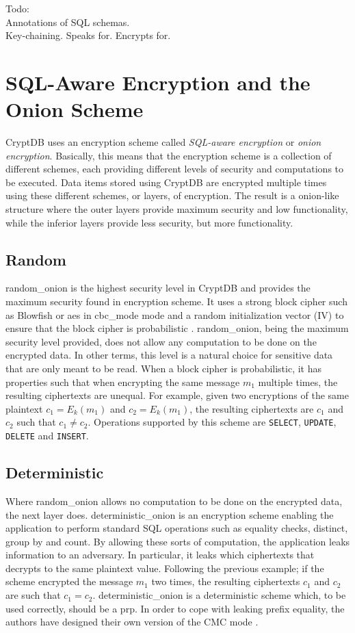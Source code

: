 Todo:\\
Annotations of SQL schemas.\\
Key-chaining. Speaks for. Encrypts for.\\


\section{SQL-Aware Encryption and the Onion Scheme}

CryptDB uses an encryption scheme called \emph{SQL-aware encryption} or \textit{onion encryption}. Basically, this means that the encryption scheme is a collection of different schemes, each providing different levels of security and computations to be executed. Data items stored using CryptDB are encrypted multiple times using these different schemes, or layers, of encryption. The result is a onion-like structure where the outer layers provide maximum security and low functionality, while the inferior layers provide less security, but more functionality.


\subsection{Random}
\Gls{random_onion} is the highest security level in CryptDB and provides the maximum security found in encryption scheme. It uses a strong block cipher such as Blowfish or \Gls{aes} in \Gls{cbc_mode} mode and a random initialization vector (IV) to ensure that the block cipher is probabilistic \citep{CryptDB_Main_Paper}. \Gls{random_onion}, being the maximum security level provided, does not allow any computation to be done on the encrypted data. In other terms, this level is a natural choice for sensitive data that are only meant to be read. When a block cipher is probabilistic, it has properties such that when encrypting the same message $m_1$ multiple times, the resulting ciphertexts are unequal. For example, given two encryptions of the same plaintext $c_1 = E_k(m_1)$ and $c_2 = E_k(m_1)$, the resulting ciphertexts are $c_1$ and $c_2$ such that $c_1 \neq c_2$. Operations supported by this scheme are \verb!SELECT!, \verb!UPDATE!, \verb!DELETE! and \verb!INSERT!.


\subsection{Deterministic}
Where \Gls{random_onion} allows no computation to be done on the encrypted data, the next layer does. \Gls{deterministic_onion} is an encryption scheme enabling the application to perform standard SQL operations such as equality checks, distinct, group by and count. By allowing these sorts of computation, the application leaks information to an adversary. In particular, it leaks which ciphertexts that decrypts to the same plaintext value. Following the previous example; if the scheme encrypted the message $m_1$ two times, the resulting ciphertexts $c_1$ and $c_2$ are such that $c_1 = c_2$. \Gls{deterministic_onion} is a deterministic scheme which, to be used correctly, should be a \Gls{prp}. In order to cope with leaking prefix equality, the authors have designed their own version of the CMC mode \cite{CryptDB_Main_Paper}.


